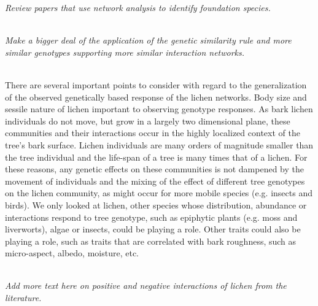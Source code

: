 \documentclass[11pt,twocolumn,twoside,lineno]{pnas-new}
\begin{document}
\textit{Review papers that use network analysis to identify foundation
species.}

\\

\textit{Make a bigger deal of the application of the genetic
  similarity rule and more similar genotypes supporting more similar
  interaction networks.}

\\

There are several important points to consider with regard to the
generalization of the observed genetically based response of the
lichen networks. Body size and sessile nature of lichen important to
observing genotype responses. As bark lichen individuals do not move,
but grow in a largely two dimensional plane, these communities and
their interactions occur in the highly localized context of the tree's
bark surface. Lichen individuals are many orders of magnitude smaller
than the tree individual and the life-span of a tree is many times
that of a lichen. For these reasons, any genetic effects on these
communities is not dampened by the movement of individuals and the
mixing of the effect of different tree genotypes on the lichen
community, as might occur for more mobile species (e.g. insects and
birds). We only looked at lichen, other species whose distribution,
abundance or interactions respond to tree genotype, such as epiphytic
plants (e.g. moss and liverworts), algae or insects, could be playing
a role. Other traits could also be playing a role, such as traits that
are correlated with bark roughness, such as micro-aspect, albedo,
moisture, etc.




\\

\textit{Add more text here on positive and negative interactions of
  lichen from the literature.} 

\\
\end{document}
